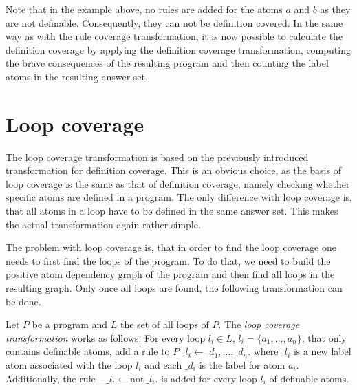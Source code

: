 Note that in the example above, no rules are added for the atoms $a$ and $b$ as they are not definable. Consequently, they can not be definition covered. In the same way as with the rule coverage transformation, it is now possible to calculate the definition coverage by applying the definition coverage transformation, computing the brave consequences of the resulting program and then counting the label atoms in the resulting answer set.

\begin{comment}
    - $\_di$ label for every atom i     \/
    
    - if atom i is definable (it appears in the head of a rule, aka $Def(a_i)\neq\emptyset$) add new rule to program: $\_di :- \_rj$. for every rule j that defines atom i 
    (every rule j that has atom i in its head, aka every $r_j \in Def(a_i)$)    \/
    
    - example           \/
    
    - if one of the rules is covered (its body is true) then atom i is covered and $\_di$ will appear in the answer set     \/
    
    -> $\_di$ in answer set <=> atom i is positively covered    \/
    
    -> $\_di$ not in answer set <=> atom i is negatively covered (proof for these?)  \/
\end{comment}

\section{Loop coverage}
\label{sec:Computing coverage metrics for propositional programs/Loop coverage}
The loop coverage transformation is based on the previously introduced transformation for definition coverage. This is an obvious choice, as the basis of loop coverage is the same as that of definition coverage, namely checking whether specific atoms are defined in a program. The only difference with loop coverage is, that all atoms in a loop have to be defined in the same answer set. This makes the actual transformation again rather simple. 

The problem with loop coverage is, that in order to find the loop coverage one needs to first find the loops of the program. To do that, we need to build the positive atom dependency graph of the program and then find all loops in the resulting graph. Only once all loops are found, the following transformation can be done.

\begin{definition}
\label{def:loop transformation}
     Let $P$ be a program and $L$ the set of all loops of $P$. The \emph{loop coverage transformation} works as follows: For every loop \(l_i \in L\), \(l_i = \{a_1, \ldots, a_n\}\), that only contains definable atoms, add a rule to $P$ \(\_l_i \leftarrow \_d_1, \ldots, \_d_n.\) where $\_l_i$ is a new label atom associated with the loop $l_i$ and each $\_d_i$ is the label for atom $a_i$. Additionally, the rule \(-\_l_i \leftarrow \text{not}\ \_l_i.\) is added for every loop $l_i$ of definable atoms.
\end{definition}

